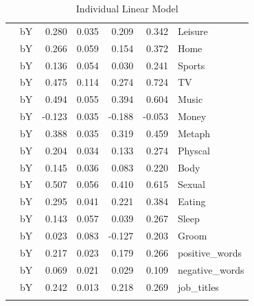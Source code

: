 \documentclass[11pt,a4paper]{article}
\begin{document}
\begin{longtable}{llrrrrl}
   & bY &  0.280 &  0.035 &    0.209 &     0.342 &         Leisure \\
   & bY &  0.266 &  0.059 &    0.154 &     0.372 &            Home \\
   & bY &  0.136 &  0.054 &    0.030 &     0.241 &          Sports \\
   & bY &  0.475 &  0.114 &    0.274 &     0.724 &              TV \\
   & bY &  0.494 &  0.055 &    0.394 &     0.604 &           Music \\
   & bY & -0.123 &  0.035 &   -0.188 &    -0.053 &           Money \\
   & bY &  0.388 &  0.035 &    0.319 &     0.459 &          Metaph \\
   & bY &  0.204 &  0.034 &    0.133 &     0.274 &         Physcal \\
   & bY &  0.145 &  0.036 &    0.083 &     0.220 &            Body \\
   & bY &  0.507 &  0.056 &    0.410 &     0.615 &          Sexual \\
   & bY &  0.295 &  0.041 &    0.221 &     0.384 &          Eating \\
   & bY &  0.143 &  0.057 &    0.039 &     0.267 &           Sleep \\
   & bY &  0.023 &  0.083 &   -0.127 &     0.203 &           Groom \\
   & bY &  0.217 &  0.023 &    0.179 &     0.266 &  positive\_words \\
   & bY &  0.069 &  0.021 &    0.029 &     0.109 &  negative\_words \\
   & bY &  0.242 &  0.013 &    0.218 &     0.269 &      job\_titles \\
\bottomrule
\caption{Individual Linear Model}
\end{longtable}
\clearpage
\twocolumn
\end{document}
